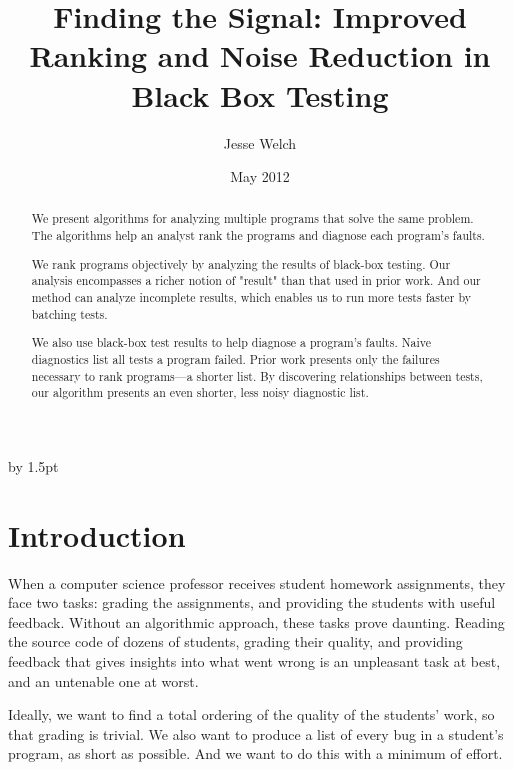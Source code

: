 \documentclass[11pt,twoside]{article}
\theoremstyle{definition}
\begin{document}
\advance\extrarowheight by 1.5pt

\title{Finding the Signal: Improved Ranking and Noise Reduction in Black Box Testing}
\author{Jesse Welch}
\date{May 2012}

\pagestyle{headings}


\maketitle

\begin{abstract}
We present algorithms for analyzing multiple programs that solve the
same problem.  The algorithms help an analyst rank the programs and
diagnose each program's faults.

We rank programs objectively by analyzing the results of black-box
testing.  Our analysis encompasses a richer notion of "result" than
that used in prior work.  And our method can analyze incomplete
results, which enables us to run more tests faster by batching tests.

We also use black-box test results to help diagnose a program's
faults.  Naive diagnostics list all tests a program failed.  Prior
work presents only the failures necessary to rank programs---a shorter
list.  By discovering relationships between tests, our algorithm
presents an even shorter, less noisy diagnostic list.
\end{abstract}

\newpage
\tableofcontents
\newpage

\baselineskip %


\section{Introduction}
When a computer science professor receives student homework assignments, they face two tasks: grading the assignments, and providing the students with useful feedback. Without an algorithmic approach, these tasks prove daunting. Reading the source code of dozens of students, grading their quality, and providing feedback that gives insights into what went wrong is an unpleasant task at best, and an untenable one at worst.

Ideally, we want to find a total ordering of the quality of the students' work, so that grading is trivial. We also want to produce a list of every bug in a student's program, as short as possible. And we want to do this with a minimum of effort.
\end{document}

